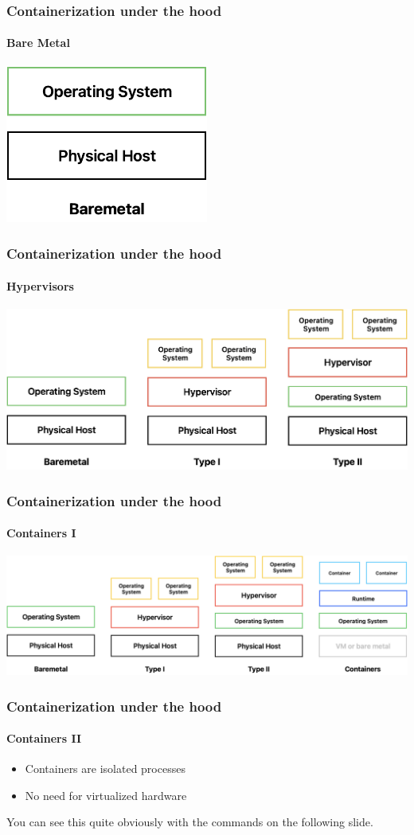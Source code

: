 \begin{frame}
    \frametitle{Containerization under the hood}
    \framesubtitle{Bare Metal}
    \centering \includegraphics[width=0.5\textwidth]{images/baremetal}
\end{frame}

\begin{frame}
    \frametitle{Containerization under the hood}
    \framesubtitle{Hypervisors}
    \centering \includegraphics[width=\textwidth]{images/baremetal_vs_hv}
\end{frame}

\begin{frame}
    \frametitle{Containerization under the hood}
    \framesubtitle{Containers I}
    \centering \includegraphics[width=\textwidth]{images/containers}
\end{frame}

\begin{frame}
    \frametitle{Containerization under the hood}
    \framesubtitle{Containers II}
    \begin{itemize}
        \item Containers are isolated processes
        \item No need for virtualized hardware
    \end{itemize}
    \vspace{0.5cm}
    You can see this quite obviously with the commands on the following slide.
\end{frame}


